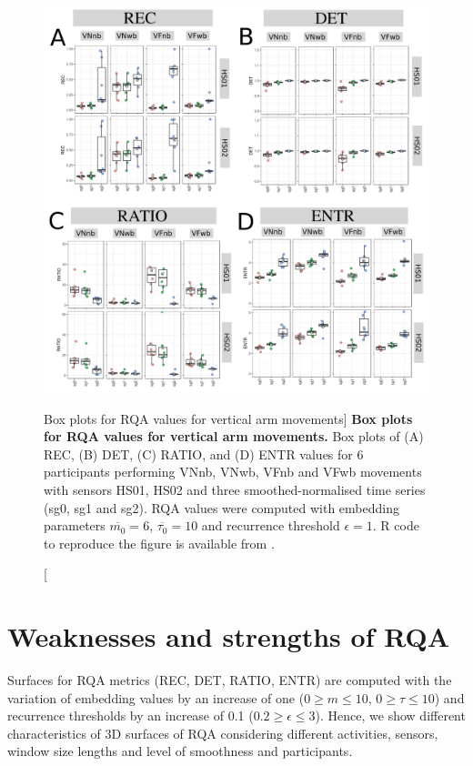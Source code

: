 \begin{figure}
\centering
\includegraphics[width=1.0\textwidth]{fig_5_14}
	\caption
	[Box plots for RQA values for vertical arm movements]{
	{\bf Box plots for RQA values for vertical arm movements.} 
 	Box plots of (A) REC, (B) DET, (C) RATIO, and (D) ENTR values 
	for 6 participants performing VNnb, VNwb, VFnb and VFwb movements
	with sensors HS01, HS02 and three smoothed-normalised  
	time series (sg0, sg1 and sg2).
	RQA values were computed with 
	embedding parameters $\overline{m_0}=6$, $\overline{\tau_0}=10$ and 
	recurrence threshold $\epsilon=1$.
	R code to reproduce the figure is available from \cite{xochicale2018}.
        }
    \label{fig:BPRQAV}
\end{figure}

\newpage
\section{Weaknesses and strengths of RQA} \label{wsRQAhii}
Surfaces for RQA metrics (REC, DET, RATIO, ENTR) are computed with the 
variation of embedding values by an increase of one 
($0 \ge m \le 10$, $0 \ge \tau \le 10$) 
and recurrence thresholds by an increase of 0.1 ($0.2 \ge \epsilon \le 3$).
Hence, we show different characteristics of 3D surfaces of RQA considering 
different activities, sensors, window size lengths and level of smoothness 
and participants.

